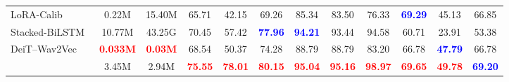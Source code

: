\documentclass[sigconf,screen,review,anonymous]{acmart}
\begin{document}
\begin{table}[t]
{\begin{tabular}{lcc|ccc|ccc|ccc}
LoRA-Calib~\cite{hsiao2023lora} & 0.22M & 15.40M & 65.71 & 42.15 & 69.26 & 85.34 & 83.50 & 76.33 & \textcolor{blue}{\textbf{69.29}} & 45.13 & 66.85 \\
Stacked-BiLSTM~\cite{sehrawat2023deception} & 10.77M & 43.25G & 70.45 & 57.42 & \textcolor{blue}{\textbf{77.96}} & \textcolor{blue}{\textbf{94.21}} & 93.44 & 94.58 & 60.71 & 23.91 & 53.38 \\
DeiT--Wav2Vec~\cite{zhuo2024video} & \textcolor{red}{\textbf{0.033M}} & \textcolor{red}{\textbf{0.03M}} & 68.54 & 50.37 & 74.28 & 88.79 & 88.79 & 83.20 & 66.78 & \textcolor{blue}{\textbf{47.79}} & 66.78 \\
\midrule
\rowcolor[HTML]{F5F5F5}
\multicolumn{1}{c}{\textbf{AMPA (Ours)}} & 3.45M & 2.94M &
\textcolor{red}{\textbf{75.55}} & \textcolor{red}{\textbf{78.01}} &
\textcolor{red}{\textbf{80.15}} & \textcolor{red}{\textbf{95.04}} &
\textcolor{red}{\textbf{95.16}} & \textcolor{red}{\textbf{98.97}} &
\textcolor{red}{\textbf{69.65}} & \textcolor{red}{\textbf{49.78}} & \textcolor{blue}{\textbf{69.20}} \\
\bottomrule
\end{tabular}
}
\end{table}
\end{document}
